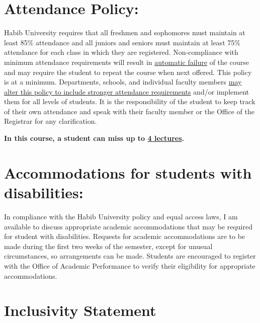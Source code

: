 \documentclass[a4paper]{article}
\begin{document}

\section{Attendance Policy:}

Habib University requires that all freshmen and sophomores must maintain at least 85\% attendance and all juniors and seniors must maintain at least 75\% attendance for each class in which they are registered. Non-compliance with minimum attendance requirements will result in \underline{automatic failure} of the course and may require the student to repeat the course when next offered. This policy is at a minimum. Departments, schools, and individual faculty members \underline{may alter this policy to include stronger attendance requirements} and/or implement them for all levels of students.  It is the responsibility of the student to keep track of their own attendance and speak with their faculty member or the Office of the Registrar for any clarification.

{\bf In this course, a student can miss up to \underline{4 lectures}.}

\section{Accommodations for students with disabilities:}

In compliance with the Habib University policy and equal access laws, I am available to discuss appropriate academic accommodations that may be required for student with disabilities. Requests for academic accommodations are to be made during the first two weeks of the semester, except for unusual circumstances, so arrangements can be made. Students are encouraged to register with the Office of Academic Performance to verify their eligibility for appropriate accommodations.

\section{Inclusivity Statement}
\end{document}
